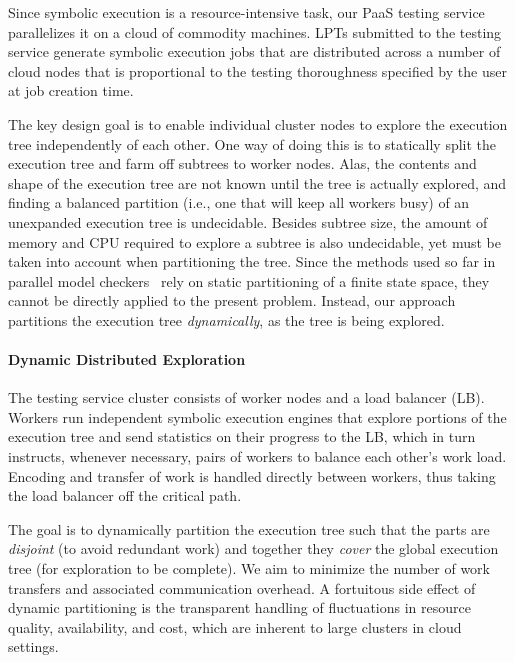 
Since symbolic execution is a resource-intensive task, our PaaS testing service parallelizes it on a cloud of commodity machines.
%
LPTs submitted to the testing service generate symbolic execution jobs that are distributed across a number of cloud nodes that is proportional to the testing thoroughness specified by the user at job creation time.


The key design goal is to enable individual cluster nodes to explore the execution tree independently of each other.  One way of doing this is to statically split the execution tree and farm off subtrees to worker nodes.  Alas, the contents and shape of the execution tree are not known until the tree is actually explored, and finding a balanced partition (i.e., one that will keep all workers busy) of an unexpanded execution tree is undecidable.  Besides subtree size, the amount of  memory and CPU required to explore a subtree is also undecidable, yet must be taken into account when partitioning the tree. Since the methods used so far in parallel model checkers~\cite{swarm,spin:multicore-modelchecking} rely on static partitioning of a finite state space, they cannot be directly applied to the present problem. Instead, our approach partitions the execution tree {\em dynamically}, as the tree is being explored. 

\paragraph{Dynamic Distributed Exploration}

The testing service cluster consists of wor\-ker nodes and a load balancer (LB).  Workers run independent symbolic execution engines that explore portions of the execution tree and send statistics on their progress to the LB, which in turn instructs, whenever necessary, pairs of workers to balance each other's work load.  Encoding and transfer of work is handled directly between workers, thus taking the load balancer off the critical path.

The goal is to dynamically partition the execution tree such that the parts are {\em disjoint} (to avoid redundant work) and together they {\em cover} the global execution tree (for exploration to be complete).  We aim to minimize the number of work transfers and associated communication overhead.  A fortuitous side effect of dynamic partitioning is the transparent handling of fluctuations in resource quality, availability, and cost, which are inherent to large clusters in cloud settings.

